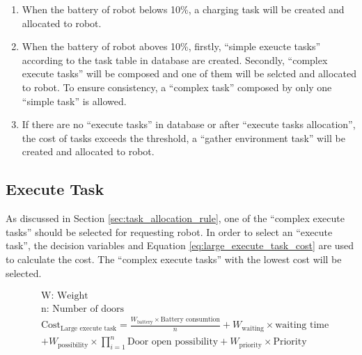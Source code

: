 \begin{enumerate}
	\label{sec:task_allocation_rule}
	\item When the battery of robot belows 10\%, a charging task will be created and allocated to robot.
	\item When the battery of robot aboves 10\%, firstly, ``simple exeucte tasks'' according to the task table in database are created. Secondly, ``complex execute tasks'' will be composed and one of them will be selcted and allocated to robot. To ensure consistency, a ``complex task'' composed by only one ``simple task'' is allowed. 
    \item If there are no ``execute tasks'' in database or after ``execute tasks allocation'', the cost of tasks exceeds the threshold, a ``gather environment task'' will be created and allocated to robot.
\end{enumerate}

\subsection{Execute Task}
As discussed in Section \ref{sec:task_allocation_rule}, one of the ``complex execute tasks'' should be selected for requesting robot. In order to select an ``execute task'', the decision variables and Equation \ref{eq:large_execute_task_cost} are used to calculate the cost. The ``complex execute tasks'' with the lowest cost will be selected.

\begin{equation}
	\label{eq:large_execute_task_cost} 
	\begin{aligned}
	& \mbox{W: Weight } \\
	& \mbox{n: Number of doors} \\
	& \mbox{Cost}_{\mbox{Large execute task}} = \frac{W_{\mbox{battery}} \times \mbox{Battery consumtion}}{n} + W_{\mbox{waiting}} \times \mbox{waiting time} \\
	& + W_{\mbox{possibility}} \times \prod\limits_{i=1}^n \mbox{Door open possibility}  + W_{\mbox{priority}} \times \mbox{Priority}
	\end{aligned}
\end{equation}

